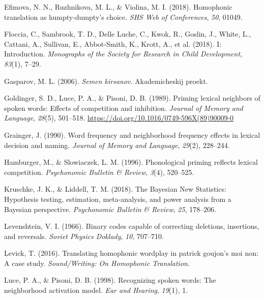 \documentclass[
]{article}
\newlength{\cslhangindent}
\newenvironment{CSLReferences}[2] %
 {\begin{list}{}{%
  \setlength{\itemindent}{0pt}
  \setlength{\leftmargin}{0pt}
  \setlength{\parsep}{0pt}
  \ifodd #1
   \setlength{\leftmargin}{\cslhangindent}
   \setlength{\itemindent}{-1\cslhangindent}
  \fi
  \setlength{\itemsep}{#2\baselineskip}}}
 {\end{list}}
\begin{document}
\begin{CSLReferences}{1}{0}
Efimova, N. N., Ruzhnikova, M. L., \& Violina, M. I. (2018). Homophonic
translation as humpty-dumpty's choice. \emph{SHS Web of Conferences},
\emph{50}, 01049.

Floccia, C., Sambrook, T. D., Delle Luche, C., Kwok, R., Goslin, J.,
White, L., Cattani, A., Sullivan, E., Abbot-Smith, K., Krott, A., et al.
(2018). I: {Introduction}. \emph{Monographs of the Society for Research
in Child Development}, \emph{83}(1), 7--29.

Gasparov, M. L. (2006). \emph{Semen kirsanov}. Akademicheskij proekt.

Goldinger, S. D., Luce, P. A., \& Pisoni, D. B. (1989). Priming lexical
neighbors of spoken words: {Effects} of competition and inhibition.
\emph{Journal of Memory and Language}, \emph{28}(5), 501--518.
\url{https://doi.org/10.1016/0749-596X(89)90009-0}

Grainger, J. (1990). Word frequency and neighborhood frequency effects
in lexical decision and naming. \emph{Journal of Memory and Language},
\emph{29}(2), 228--244.

Hamburger, M., \& Slowiaczek, L. M. (1996). Phonological priming
reflects lexical competition. \emph{Psychonomic Bulletin \& Review},
\emph{3}(4), 520--525.

Kruschke, J. K., \& Liddell, T. M. (2018). The {Bayesian New
Statistics}: {Hypothesis} testing, estimation, meta-analysis, and power
analysis from a {Bayesian} perspective. \emph{Psychonomic Bulletin \&
Review}, \emph{25}, 178--206.

Levenshtein, V. I. (1966). Binary codes capable of correcting deletions,
insertions, and reversals. \emph{Soviet Physics Doklady}, \emph{10},
707--710.

Levick, T. (2016). Translating homophonic wordplay in patrick goujon's
moi non: A case study. \emph{Sound/Writing: On Homophonic Translation}.

Luce, P. A., \& Pisoni, D. B. (1998). Recognizing spoken words: {The}
neighborhood activation model. \emph{Ear and Hearing}, \emph{19}(1), 1.


\end{CSLReferences}
\end{document}

